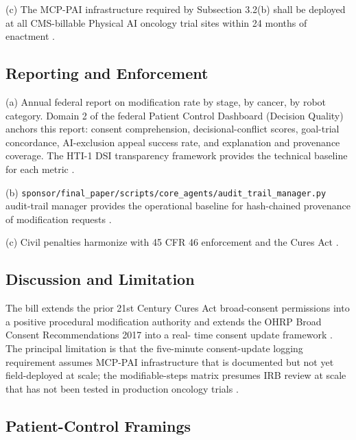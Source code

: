 (c) The MCP-PAI infrastructure required by Subsection 3.2(b) shall
be deployed at all CMS-billable Physical AI oncology trial sites
within 24 months of enactment \cite{kawchak_2026_19244918}.

\subsection{Reporting and Enforcement}

\hspace{0.5cm} (a) Annual federal report on modification rate by stage, by cancer,
by robot category. Domain 2 of the federal Patient Control Dashboard
(Decision Quality) anchors this report: consent comprehension,
decisional-conflict scores, goal-trial concordance, AI-exclusion
appeal success rate, and explanation and provenance coverage. The
HTI-1 DSI transparency framework provides the technical baseline for
each metric \cite{hti1_dsi_fact_sheet_2023}.

(b) \texttt{sponsor/final\_paper/scripts/core\_agents/audit\_trail\_manager.py} audit-trail manager 
provides the operational baseline for hash-chained provenance of modification requests \cite{kawchak_2026_19396256}.

(c) Civil penalties harmonize with 45 CFR 46 enforcement and the
Cures Act
\cite{federal_register_info_blocking_disincentives_2024}.

\subsection{Discussion and Limitation}

\hspace{0.5cm} The bill extends the prior 21st Century Cures Act broad-consent
permissions into a positive procedural modification authority and
extends the OHRP Broad Consent Recommendations 2017 into a real-
time consent update framework \cite{rank1_cures_act_2016,
onc_cures_act_final_rule_page, ohrp_broad_consent_attachment_c_2017}.
The principal limitation is that the five-minute consent-update
logging requirement assumes MCP-PAI infrastructure that is documented
but not yet field-deployed at scale; the modifiable-steps matrix
presumes IRB review at scale that has not been tested in production
oncology trials \cite{kawchak_2026_18973368}.

\subsection{Patient-Control Framings}

